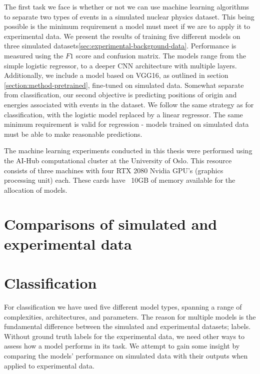 The first task we face is whether or not we can use machine learning algorithms to 
separate two types of events in a simulated nuclear physics dataset. This being possible
is the minimum requirement a model must meet if we are to apply it to experimental data.
We present the results of training five different models on three simulated datasets\ref{sec:experimental-background-data}.
Performance is measured using the $F1$ score and confusion matrix. The models range from
the simple logistic regressor, to a deeper CNN architecture with multiple layers. Additionally,
we include a model based on VGG16, as outlined in section \ref{section:method-pretrained},
fine-tuned on simulated data. Somewhat separate from classification, our second objective
is predicting positions of origin and energies associated with events in the dataset.
We follow the same strategy as for classification, with the logistic model replaced by a linear
regressor. The same minimum requirement is valid for regression - models trained on simulated data
must be able to make reasonable predictions.

The machine learning experiments conducted in this thesis were performed
using the AI-Hub computational cluster at the University of Oslo. This resource 
consists of three machines with four RTX 2080 Nvidia GPU’s (graphics
processing unit) each. These cards have ~10GB of memory available for the
allocation of models.

\section{Comparisons of simulated and experimental data}



\section{Classification}
For classification we have used five different model types,
spanning a range of complexities, architectures, and parameters.
The reason for multiple models is the fundamental difference between the
simulated and experimental datasets; labels. Without ground truth labels
for the experimental data, we need other ways to assess how a model performs in
its task. We attempt to gain some insight by comparing the models' performance on
simulated data with their outputs when applied to experimental data.

